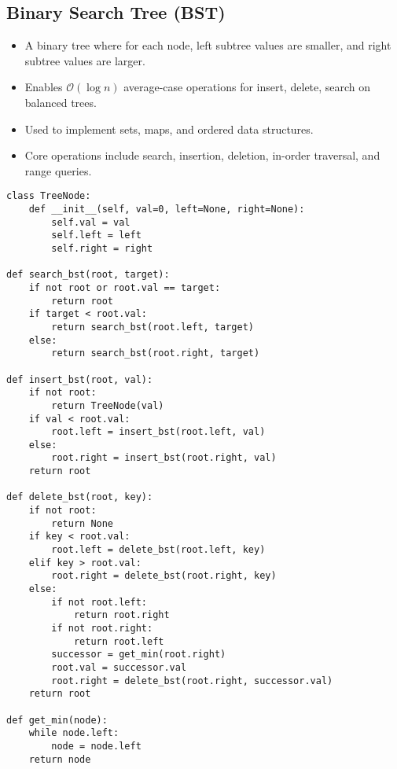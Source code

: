 \subsection{Binary Search Tree (BST)}
\begin{summary}
    \begin{itemize}
        \item A binary tree where for each node, left subtree values are smaller, and right subtree values are larger.
        \item Enables $\mathcal{O}(\log n)$ average-case operations for insert, delete, search on balanced trees.
        \item Used to implement sets, maps, and ordered data structures.
        \item Core operations include search, insertion, deletion, in-order traversal, and range queries.
    \end{itemize}
\end{summary}

\begin{algo}
\begin{lstlisting}
class TreeNode:
    def __init__(self, val=0, left=None, right=None):
        self.val = val
        self.left = left
        self.right = right

def search_bst(root, target):
    if not root or root.val == target:
        return root
    if target < root.val:
        return search_bst(root.left, target)
    else:
        return search_bst(root.right, target)

def insert_bst(root, val):
    if not root:
        return TreeNode(val)
    if val < root.val:
        root.left = insert_bst(root.left, val)
    else:
        root.right = insert_bst(root.right, val)
    return root

def delete_bst(root, key):
    if not root:
        return None
    if key < root.val:
        root.left = delete_bst(root.left, key)
    elif key > root.val:
        root.right = delete_bst(root.right, key)
    else:
        if not root.left:
            return root.right
        if not root.right:
            return root.left
        successor = get_min(root.right)
        root.val = successor.val
        root.right = delete_bst(root.right, successor.val)
    return root

def get_min(node):
    while node.left:
        node = node.left
    return node
\end{lstlisting}
\end{algo}

